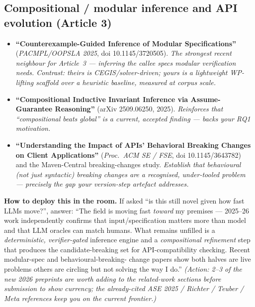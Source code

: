 \documentclass[11pt]{article}
\begin{document}
\subsection{Compositional / modular inference and API evolution (Article 3)}
\begin{itemize}[leftmargin=1.4em,itemsep=0.1em]
  \item \textbf{``Counterexample-Guided Inference of Modular Specifications''}
        (\emph{PACMPL/OOPSLA 2025}, doi 10.1145/3720505). \emph{The strongest
        recent neighbour for Article~3 --- inferring the callee specs modular
        verification needs. Contrast: theirs is CEGIS/solver-driven; yours is
        a lightweight WP-lifting scaffold over a heuristic baseline, measured
        at corpus scale.}
  \item \textbf{``Compositional Inductive Invariant Inference via
        Assume-Guarantee Reasoning''} (arXiv 2509.06250, 2025). \emph{Reinforces
        that ``compositional beats global'' is a current, accepted finding ---
        backs your RQ1 motivation.}
  \item \textbf{``Understanding the Impact of APIs' Behavioral Breaking Changes
        on Client Applications''} (\emph{Proc.\ ACM SE / FSE},
        doi 10.1145/3643782) and the Maven-Central breaking-changes study.
        \emph{Establish that behavioural (not just syntactic) breaking changes
        are a recognised, under-tooled problem --- precisely the gap your
        version-step artefact addresses.}
\end{itemize}

\textbf{How to deploy this in the room.} If asked ``is this still novel given
how fast LLMs move?'', answer: ``The field is moving fast \emph{toward} my
premises --- 2025--26 work independently confirms that input/specification
matters more than model and that LLM oracles can match humans. What remains
unfilled is a \emph{deterministic, verifier-gated} inference engine and a
\emph{compositional refinement} step that produces the candidate-breaking set
for API-compatibility checking. Recent modular-spec and behavioural-breaking-
change papers show both halves are live problems others are circling but not
solving the way I do.'' \emph{(Action: 2--3 of the new 2026 preprints are worth
adding to the related-work sections before submission to show currency; the
already-cited ASE 2025 / Richter / Teuber / Meta references keep you on the
current frontier.)}

\end{document}
